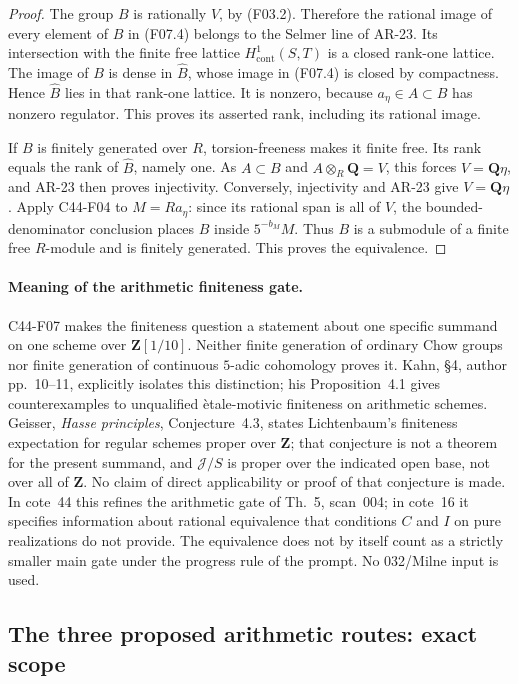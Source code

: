 \begin{proof}
The group $B$ is rationally $V$, by (F03.2).  Therefore the
rational image of every element of $B$ in (F07.4) belongs to
the Selmer line of AR-23.  Its intersection with the finite
free lattice $H^1_{\mathrm{cont}}(S,T)$ is a closed rank-one
lattice.  The image of $B$ is dense in $\widehat B$, whose
image in (F07.4) is closed by compactness.  Hence
$\widehat B$ lies in that rank-one lattice.  It is nonzero,
because $a_\eta\in A\subset B$ has nonzero regulator.
This proves its asserted rank, including its rational image.

If $B$ is finitely generated over $R$, torsion-freeness makes
it finite free.  Its rank equals the rank of $\widehat B$,
namely one.  As $A\subset B$ and $A\otimes_R\mathbf Q=V$,
this forces $V=\mathbf Q\eta$, and AR-23 then proves
injectivity.  Conversely, injectivity and AR-23 give
$V=\mathbf Q\eta$.  Apply C44-F04 to $M=Ra_\eta$: since
its rational span is all of $V$, the bounded-denominator
conclusion places $B$ inside $5^{-b_M}M$.  Thus $B$ is a
submodule of a finite free $R$-module and is finitely
generated.  This proves the equivalence.
\end{proof}

\paragraph{Meaning of the arithmetic finiteness gate.}
C44-F07 makes the finiteness question a statement about one
specific summand on one scheme over $\mathbf Z[1/10]$.
Neither finite generation of ordinary Chow groups nor
finite generation of continuous \(5\)-adic cohomology proves
it.  Kahn, \S4, author pp.~10--11, explicitly isolates this
distinction; his Proposition~4.1 gives counterexamples to
unqualified \`etale-motivic finiteness on arithmetic schemes.
Geisser, \emph{Hasse principles}, Conjecture~4.3, states
Lichtenbaum's finiteness expectation for regular schemes
proper over $\mathbf Z$; that conjecture is not a theorem
for the present summand, and $\mathcal J/S$ is proper over
the indicated open base, not over all of $\mathbf Z$.
No claim of direct applicability or proof of that conjecture
is made.  In cote~44 this refines the arithmetic gate of
Th.~5, scan~004; in cote~16 it specifies information about
rational equivalence that conditions $C$ and $I$ on pure
realizations do not provide.  The equivalence does not by
itself count as a strictly smaller main gate under the
progress rule of the prompt.  No 032/Milne input is used.

\subsection{The three proposed arithmetic routes: exact scope}

